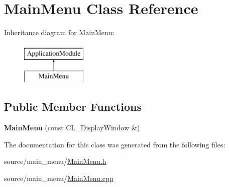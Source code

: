 \hypertarget{classMainMenu}{
\section{MainMenu Class Reference}
\label{classMainMenu}
}
Inheritance diagram for MainMenu:\begin{figure}[H]
\begin{center}
\leavevmode
\includegraphics[height=2cm]{classMainMenu}
\end{center}
\end{figure}
\subsection*{Public Member Functions}
\begin{DoxyCompactItemize}
\item 
\hypertarget{classMainMenu_a38e8a8788c39da6de1d080e73acfbe70}{
{\bfseries MainMenu} (const CL\_\-DisplayWindow \&)}
\label{classMainMenu_a38e8a8788c39da6de1d080e73acfbe70}

\end{DoxyCompactItemize}


The documentation for this class was generated from the following files:\begin{DoxyCompactItemize}
\item 
source/main\_\-menu/\hyperlink{MainMenu_8h}{MainMenu.h}\item 
source/main\_\-menu/\hyperlink{MainMenu_8cpp}{MainMenu.cpp}\end{DoxyCompactItemize}
